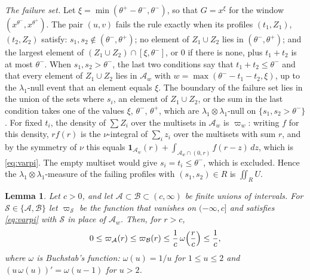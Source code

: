 \documentclass[aps,prd,twocolumn,superscriptaddress,nofootinbib,longbibliography,floatfix,showkeys,nobalancelastpage,amsmath,amssymb,10pt]{revtex4-2}
\theoremstyle{plain}
\newtheorem{lemma}[theorem]{Lemma}
\theoremstyle{definition}
\theoremstyle{plain}
\newcommand{\one}{\mathbf{1}}
\begin{document}
\emph{The failure set.} Let $\xi=\min(\theta^+-\theta^-,\theta^-)$, so that $G=x^\xi$ for the window $(x^{\theta^-},x^{\theta^+})$. The pair $(u,v)$ fails the rule exactly when its profiles $(t_1,Z_1)$, $(t_2,Z_2)$ satisfy: $s_1,s_2\notin(\theta^-,\theta^+)$; no element of $Z_1\cup Z_2$ lies in $(\theta^-,\theta^+)$; and the largest element of $(Z_1\cup Z_2)\cap[\xi,\theta^-]$, or $0$ if there is none, plus $t_1+t_2$ is at most $\theta^-$. When $s_1,s_2>\theta^-$, the last two conditions say that $t_1+t_2\le\theta^-$ and that every element of $Z_1\cup Z_2$ lies in $\mathcal A_w$ with $w=\max(\theta^--t_1-t_2,\xi)$, up to the $\lambda_1$-null event that an element equals $\xi$. The boundary of the failure set lies in the union of the sets where $s_i$, an element of $Z_1\cup Z_2$, or the sum in the last condition takes one of the values $\xi$, $\theta^-$, $\theta^+$, which are $\lambda_1\otimes\lambda_1$-null on $\{s_1,s_2>\theta^-\}$. For fixed $t_i$, the density of $\sum Z_i$ over the multisets in $\mathcal A_w$ is $\varpi_w$: writing $f$ for this density, $r f(r)$ is the $\nu$-integral of $\sum_iz_i$ over the multisets with sum $r$, and by the symmetry of $\nu$ this equals $\one_{\mathcal A_w}(r)+\int_{\mathcal A_w\cap(0,r)}f(r-z)\,dz$, which is \eqref{eq:varpi}. The empty multiset would give $s_i=t_i\le\theta^-$, which is excluded. Hence the $\lambda_1\otimes\lambda_1$-measure of the failing profiles with $(s_1,s_2)\in R$ is $\iint_RU$.

\begin{lemma}\label{lem:mono}
Let $c>0$, and let $\mathcal A\subset\mathcal B\subset(c,\infty)$ be finite unions of intervals. For $\mathcal S\in\{\mathcal A,\mathcal B\}$ let $\varpi_{\mathcal S}$ be the function that vanishes on $(-\infty,c]$ and satisfies \eqref{eq:varpi} with $\mathcal S$ in place of $\mathcal A_w$. Then, for $r>c$,
\[
0\le\varpi_{\mathcal A}(r)\le\varpi_{\mathcal B}(r)\le\frac1c\,\omega\Bigl(\frac rc\Bigr)\le\frac1c,
\]
where $\omega$ is Buchstab's function: $\omega(u)=1/u$ for $1\le u\le2$ and $(u\,\omega(u))'=\omega(u-1)$ for $u>2$.
\end{lemma}
\end{document}
